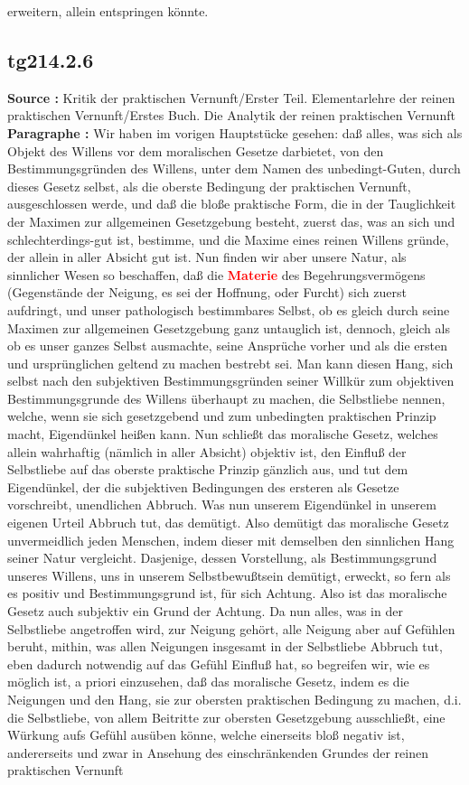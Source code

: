 \documentclass[a4paper,12pt,twoside]{book}
\newcommand{\match}[1]{\textcolor{red}{\textbf{#1}}}
\begin{document}
erweitern, allein entspringen könnte. 
	
	\subsection*{tg214.2.6} 
	\textbf{Source : }Kritik der praktischen Vernunft/Erster Teil. Elementarlehre der reinen praktischen Vernunft/Erstes Buch. Die Analytik der reinen praktischen Vernunft\\  
	
	\noindent\textbf{Paragraphe : }Wir haben im vorigen Hauptstücke gesehen: daß alles, was sich als Objekt des Willens vor dem moralischen Gesetze darbietet, von den Bestimmungsgründen des Willens, unter dem Namen des unbedingt-Guten, durch dieses Gesetz selbst, als die oberste Bedingung der praktischen Vernunft, ausgeschlossen werde, und daß die bloße praktische Form, die in der Tauglichkeit der Maximen zur allgemeinen Gesetzgebung besteht, zuerst das, was an sich und schlechterdings-gut ist, bestimme, und die Maxime eines reinen Willens gründe, der allein in aller Absicht gut ist. Nun finden wir aber unsere Natur, als sinnlicher Wesen so beschaffen, daß die \match{Materie} des Begehrungsvermögens (Gegenstände der Neigung, es sei der Hoffnung, oder Furcht) sich zuerst aufdringt, und unser pathologisch bestimmbares Selbst, ob es gleich durch seine Maximen zur allgemeinen Gesetzgebung ganz untauglich ist, dennoch, gleich als ob es unser ganzes Selbst ausmachte, seine Ansprüche vorher und als die ersten und ursprünglichen geltend zu machen bestrebt sei. Man kann diesen Hang, sich selbst nach den subjektiven Bestimmungsgründen seiner Willkür zum objektiven Bestimmungsgrunde des Willens überhaupt zu machen, die Selbstliebe nennen, welche, wenn sie sich gesetzgebend und zum unbedingten praktischen Prinzip macht, Eigendünkel heißen kann. Nun schließt das moralische Gesetz, welches allein wahrhaftig (nämlich in aller Absicht) objektiv ist, den Einfluß der Selbstliebe auf das oberste praktische Prinzip gänzlich aus, und tut dem Eigendünkel, der die subjektiven Bedingungen des ersteren als Gesetze vorschreibt, unendlichen Abbruch. Was nun unserem Eigendünkel in unserem eigenen Urteil Abbruch tut, das demütigt. Also demütigt das moralische Gesetz unvermeidlich  jeden Menschen, indem dieser mit demselben den sinnlichen Hang seiner Natur vergleicht. Dasjenige, dessen Vorstellung, als Bestimmungsgrund unseres Willens, uns in unserem Selbstbewußtsein demütigt, erweckt, so fern als es positiv und Bestimmungsgrund ist, für sich Achtung. Also ist das moralische Gesetz auch subjektiv ein Grund der Achtung. Da nun alles, was in der Selbstliebe angetroffen wird, zur Neigung gehört, alle Neigung aber auf Gefühlen beruht, mithin, was allen Neigungen insgesamt in der Selbstliebe Abbruch tut, eben dadurch notwendig auf das Gefühl Einfluß hat, so begreifen wir, wie es möglich ist, a priori einzusehen, daß das moralische Gesetz, indem es die Neigungen und den Hang, sie zur obersten praktischen Bedingung zu machen, d.i. die Selbstliebe, von allem Beitritte zur obersten Gesetzgebung ausschließt, eine Würkung aufs Gefühl ausüben könne, welche einerseits bloß negativ ist, andererseits und zwar in Ansehung des einschränkenden Grundes der reinen praktischen Vernunft 
\end{document}
